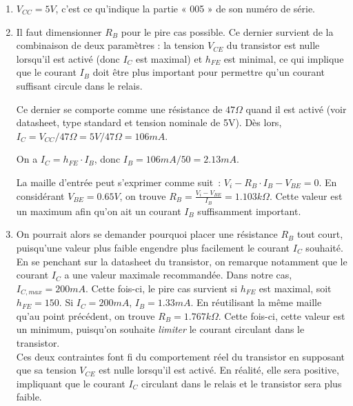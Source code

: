 \documentclass{../../template/tp}
\begin{document}
{
    \begin{enumerate}
        \item $V_{CC} = 5 V$, c'est ce qu'indique la partie « 005 » de son numéro de série.
        \item Il faut dimensionner $R_B$ pour le pire cas possible. Ce dernier survient de la combinaison de deux paramètres : la tension $V_{CE}$ du transistor est nulle lorsqu'il est activé (donc $I_C$ est maximal) et $h_{FE}$ est minimal, ce qui implique que le courant $I_B$ doit être plus important pour permettre qu'un courant suffisant circule dans le relais.

        Ce dernier se comporte comme une résistance de $47 \Omega$ quand il est activé (voir datasheet, type standard et tension nominale de 5V).
        Dès lors, $I_C = V_{CC}/47\Omega = 5 V/47\Omega = 106 mA$.

        On a $I_C = h_{FE} \cdot I_B$, donc $I_B = 106mA/50 = 2.13 mA$.

        La maille d'entrée peut s'exprimer comme suit~: $V_i - R_B \cdot I_B - V_{BE} = 0$.
        En considérant $V_{BE} = 0.65 V$, on trouve $R_B = \frac{V_i - V_{BE}}{I_B} = 1.103 k\Omega$.
        Cette valeur est un maximum afin qu'on ait un courant $I_B$ suffisamment important.

        \item On pourrait alors se demander pourquoi placer une résistance $R_B$ tout court, puisqu'une valeur plus faible engendre plus facilement le courant $I_C$ souhaité.
        En se penchant sur la datasheet du transistor, on remarque notamment que le courant $I_C$ a une valeur maximale recommandée. Dans notre cas, $I_{C,max} = 200 mA$.
        Cette fois-ci, le pire cas survient si $h_{FE}$ est maximal, soit $h_{FE} = 150$.
        Si $I_C = 200 mA$, $I_B = 1.33 mA$.
        En réutilisant la même maille qu'au point précédent, on trouve $R_B = 1.767 k\Omega$.
        Cette fois-ci, cette valeur est un minimum, puisqu'on souhaite \textit{limiter} le courant circulant dans le transistor.\\

        Ces deux contraintes font fi du comportement réel du transistor en supposant que sa tension $V_{CE}$ est nulle lorsqu'il est activé. En réalité, elle sera positive, impliquant que le courant $I_C$ circulant dans le relais et le transistor sera plus faible.
    \end{enumerate}
}
\end{document}
